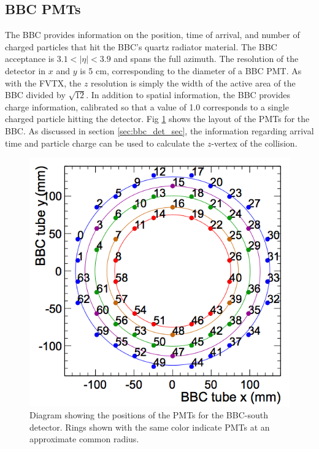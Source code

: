 \subsection{BBC PMTs}
The BBC provides information on the position, time of arrival, and number of charged particles that hit the BBC's quartz radiator material. The BBC acceptance is $3.1 < |\eta| < 3.9$ and spans the full azimuth. The resolution of the detector in $x$ and $y$ is 5 cm, corresponding to the diameter of a BBC PMT. As with the FVTX, the $z$ resolution is simply the width of the active area of the BBC divided by $\sqrt{12}$. In addition to spatial information, the BBC provides charge information, calibrated so that a value of 1.0 corresponds to a single charged particle hitting the detector. Fig \ref{fig:bbc_rings} shows the layout of the PMTs for the BBC. As discussed in section \ref{sec:bbc_det_sec}, the information regarding arrival time and particle charge can be used to calculate the $z$-vertex of the collision. 
\begin{figure}[h!]
\begin{center}
\includegraphics[width=0.55\linewidth]{figs/bbc_rings.png}
\caption{Diagram showing the positions of the PMTs for the BBC-south detector. Rings shown with the same color indicate PMTs at an approximate common radius.}
\label{fig:bbc_rings}
\end{center}
\end{figure}


